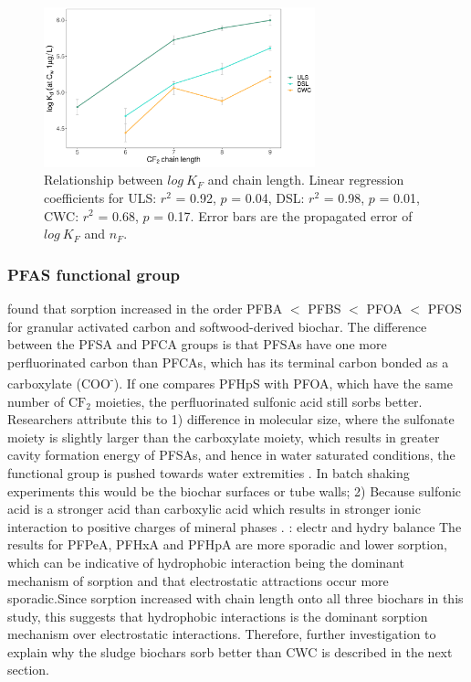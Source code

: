 \begin{figure}[tbh]
    \centering
    \includegraphics[width=0.7\textwidth]{R/figs/chain_length_Kd1ugL_plot.pdf}
    \caption{Relationship between $log~K_F$ and chain length. Linear regression coefficients for ULS: $r^2$ = 0.92, $p$ = 0.04, DSL: $r^2$ = 0.98, $p$ = 0.01, CWC: $r^2$ = 0.68, $p$ = 0.17. Error bars are the propagated error of $log~K_F$ and $n_F$.}
    \label{fig:chainlength}
\end{figure}

\subsubsection{PFAS functional group} 
\cite{zhang2021sorption} found that sorption increased in the order PFBA $<$ PFBS $<$ PFOA $<$ PFOS for granular activated carbon and softwood-derived biochar. The difference between the PFSA and PFCA groups is that PFSAs have one more perfluorinated carbon than PFCAs, which has its terminal carbon bonded as a carboxylate (COO\textsuperscript{-}). If one compares PFHpS with PFOA, which have the same number of $\mathrm{CF_2}$ moieties, the perfluorinated sulfonic acid still sorbs better. Researchers attribute this to 1) difference in molecular size, where the sulfonate moiety is slightly larger than the carboxylate moiety, which results in greater cavity formation energy of PFSAs, and hence in water saturated conditions, the functional group is pushed towards water extremities \citep{yin2022insights,sigmund2022sorption}. In batch shaking experiments this would be the biochar surfaces or tube walls; 2) Because sulfonic acid is a stronger acid than carboxylic acid which results in stronger ionic interaction to positive charges of mineral phases \citep{arvaniti2015review}. \cite{du2014adsorption}: electr and hydry balance The results for PFPeA, PFHxA and PFHpA are more sporadic and lower sorption, which can be indicative of hydrophobic interaction being the dominant mechanism of sorption and that electrostatic attractions occur more sporadic.Since sorption increased with chain length onto all three biochars in this study, this suggests that hydrophobic interactions is the dominant sorption mechanism over electrostatic interactions. Therefore, further investigation to explain why the sludge biochars sorb better than CWC is described in the next section. 

